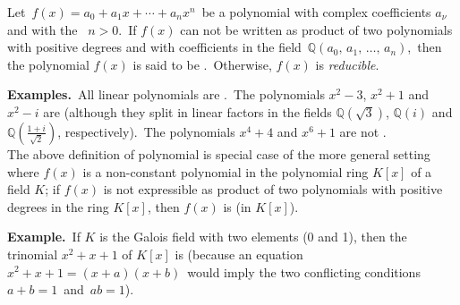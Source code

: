 \documentclass[12pt]{article}
\begin{document}
Let\, $f(x) = a_0\!+\!a_1x\!+\cdots+\!a_nx^n$\, be a polynomial with complex coefficients $a_{\nu}$ and with the \, $n > 0$.\, If $f(x)$ can not be written as product of two polynomials with positive degrees and with coefficients in the field\, $\mathbb{Q}(a_0,\,a_1,\,\ldots,\,a_n)$,\, then the polynomial $f(x)$ is said to be .\, Otherwise, $f(x)$ is {\em reducible}.

\textbf{Examples.}\, All linear polynomials are .\, The polynomials $x^2\!-\!3$, $x^2\!+\!1$ and $x^2\!-\!i$ are  (although they split in linear factors in the fields $\mathbb{Q}(\sqrt{3})$, $\mathbb{Q}(i)$ and $\mathbb{Q}(\frac{1\!+\!i}{\sqrt{2}})$, respectively).\, The polynomials $x^4\!+\!4$ and $x^6\!+\!1$ are not .\\

The above definition of  polynomial is special case of the more general setting where $f(x)$ is a non-constant polynomial in the polynomial ring $K[x]$ of a field $K$; if $f(x)$ is not expressible as product of two polynomials with positive degrees in the ring $K[x]$, then $f(x)$ is  (in $K[x]$).

\textbf{Example.}\, If $K$ is the Galois field with two elements (0 and 1), then the trinomial $x^2\!+\!x\!+\!1$ of $K[x]$ is  (because an equation\, $x^2\!+\!x\!+\!1 = (x\!+\!a)(x\!+\!b)$\, would imply the two conflicting conditions\, $a\!+\!b = 1$\, and\, $ab = 1$).
\end{document}
